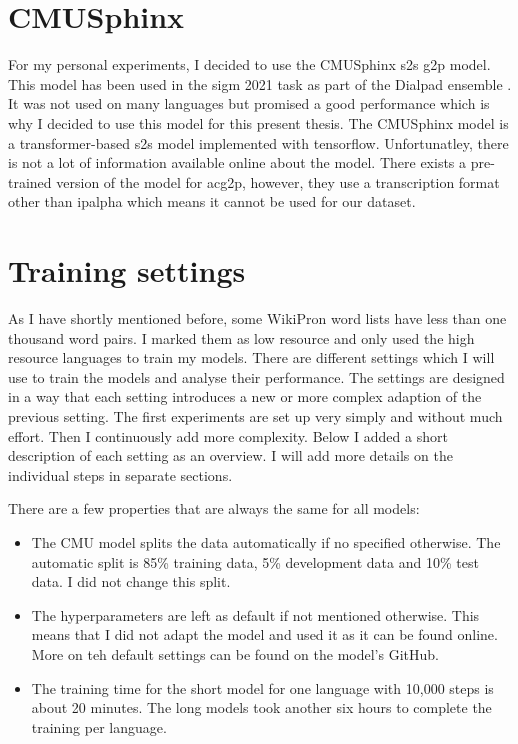 \section{CMUSphinx}
\label{sec:cmu}
For my personal experiments, I decided to use the CMUSphinx \ac{s2s} \ac{g2p} model. This model has been used in the \ac{sigm} 2021 task as part of the Dialpad ensemble \citep{gautam.2021}. It was not used on many languages but promised a good performance which is why I decided to use this model for this present thesis. The CMUSphinx model is a transformer-based \ac{s2s} model implemented with tensorflow. Unfortunatley, there is not a lot of information available online about the model. There exists a pre-trained version of the model for ac{g2p}, however, they use a transcription format other than \ac{ipalpha} which means it cannot be used for our dataset. 

\section{Training settings}
\label{sec:train-settings}
As I have shortly mentioned before, some WikiPron word lists have less than one thousand word pairs. I marked them as low resource and only used the high resource languages to train my models. There are different settings which I will use to train the models and analyse their performance. The settings are designed in a way that each setting introduces a new or more complex adaption of the previous setting. The first experiments are set up very simply and without much effort. Then I continuously add more complexity. Below I added a short description of each setting as an overview. I will add more details on the individual steps in separate sections. 

There are a few properties that are always the same for all models:
\begin{itemize}
\item The CMU model splits the data automatically if no specified otherwise. The automatic split is 85\% training data, 5\% development data and 10\% test data. I did not change this split.
\item The hyperparameters are left as default if not mentioned otherwise. This means that I did not adapt the model and used it as it can be found online. More on teh default settings can be found on the model's GitHub.
\item The training time for the short model for one language with 10,000 steps is about 20 minutes. The long models took another six hours to complete the training per language.  
\end{itemize}

